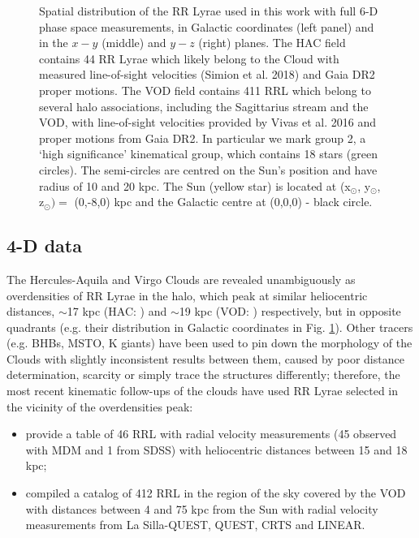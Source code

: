 \documentclass[fleqn,usenatbib]{mnras}
\begin{document}
\begin{figure}
    \caption{Spatial distribution of the RR Lyrae used in this work with full 6-D phase space measurements, in Galactic coordinates (left panel) and in the $x-y$ (middle) and $y-z$ (right) planes.  The HAC field contains 44 RR Lyrae which likely belong to the Cloud with measured line-of-sight  velocities (Simion et al. 2018) and  Gaia DR2 proper motions. The VOD field contains 411 RRL which belong to several halo associations, including the Sagittarius stream and the VOD, with line-of-sight velocities provided by Vivas et al. 2016 and proper motions from Gaia DR2. In particular we mark group 2, a `high significance' kinematical group, which contains 18 stars (green circles). The semi-circles are centred on the Sun's position and have radius of 10 and 20 kpc. The Sun (yellow star) is located at (x$_{\odot}$, y$_{\odot}$, z$_{\odot})= $ (0,-8,0) kpc and the Galactic centre at (0,0,0) - black circle.  }
    \label{fig:lb}
\end{figure}
\subsection{4-D data}
The Hercules-Aquila  and Virgo Clouds are revealed unambiguously as overdensities of RR Lyrae  in the halo, which peak at similar heliocentric distances,  $\sim$17 kpc (HAC: \citealt{Simion2014}) and $\sim$19 kpc (VOD: \citealt{Vivas2006, Duffau2014, Vivas2016}) respectively, but in opposite quadrants (e.g. their distribution in Galactic coordinates in Fig. \ref{fig:lb}). Other tracers (e.g. BHBs, MSTO, K giants) have been used to pin down the morphology of  the Clouds with slightly inconsistent results between them, caused by poor distance determination, scarcity or simply trace the structures differently; therefore, the most recent kinematic follow-ups of the clouds have used RR Lyrae selected in the vicinity of the overdensities peak: 
\begin{itemize}
\item \citet{Simion2018}  provide a table of 46 RRL with radial velocity measurements (45 observed with MDM and 1 from SDSS) with heliocentric distances between 15 and 18 kpc;
\item \cite{Vivas2016} compiled a catalog of 412 RRL in the region of the sky covered by the VOD with distances between 4 and 75 kpc from the Sun with radial velocity measurements from La Silla-QUEST, QUEST, CRTS and LINEAR. 
\end{itemize}
%
\end{document}
